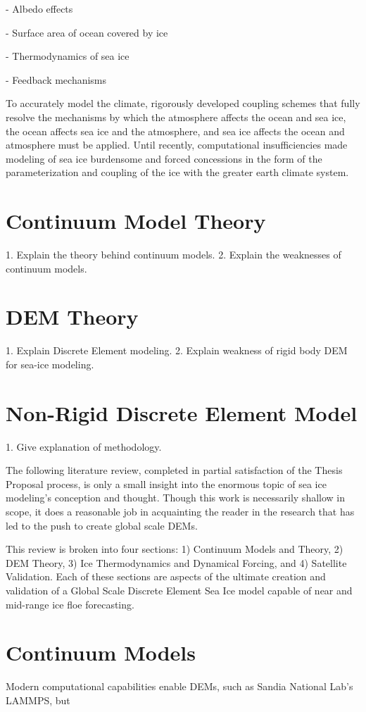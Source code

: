     - Albedo effects
    
    - Surface area of ocean covered by ice
    
    - Thermodynamics of sea ice
    
    - Feedback mechanisms
    
To accurately model the climate, rigorously developed coupling schemes that fully resolve the mechanisms by which the atmosphere affects the ocean and sea ice, the ocean affects sea ice and the atmosphere, and sea ice affects the ocean and atmosphere must be applied.  Until recently, computational insufficiencies made modeling of sea ice burdensome and forced concessions in the form of the parameterization and coupling of the ice with the greater earth climate system. 
\section{Continuum Model Theory}

1. Explain the theory behind continuum models.
2. Explain the weaknesses of continuum models.
\section{\ac{DEM} Theory}
1. Explain Discrete Element modeling.
2. Explain weakness of rigid body DEM for sea-ice modeling.
\section{Non-Rigid Discrete Element Model}
1. Give explanation of methodology.

The following literature review, completed in partial satisfaction of the Thesis Proposal process, is only a small insight into the enormous topic of sea ice modeling's conception and thought.  Though this work is necessarily shallow in scope, it does a reasonable job in acquainting the reader in the research that has led to the push to create global scale \acp{DEM}.

This review is broken into four sections: 1) Continuum Models and Theory, 2) \ac{DEM} Theory, 3) Ice Thermodynamics and Dynamical Forcing, and 4) Satellite Validation.  Each of these sections are aspects of the ultimate creation and validation of a Global Scale Discrete Element Sea Ice model capable of near and mid-range ice floe forecasting.

\section{Continuum Models}
Modern computational capabilities enable \acp{DEM}, such as Sandia National Lab's \ac{LAMMPS}, but 

